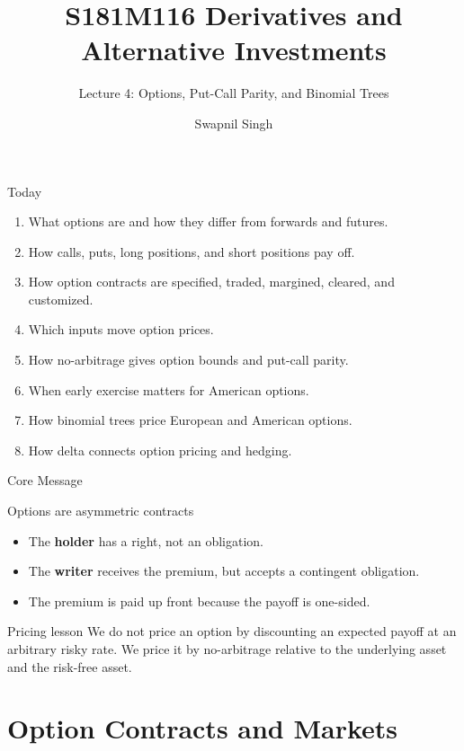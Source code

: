 \documentclass[aspectratio=169,11pt]{beamer}
\title{S181M116 Derivatives and Alternative Investments}
\subtitle{Lecture 4: Options, Put-Call Parity, and Binomial Trees}
\author{Swapnil Singh}
\institute{Lietuvos Bankas and Kaunas University of Technology}
\date{}
\begin{document}
\begin{frame}
    \titlepage
\end{frame}

\begin{frame}{Today}
    \begin{enumerate}
        \item What options are and how they differ from forwards and futures.
        \item How calls, puts, long positions, and short positions pay off.
        \item How option contracts are specified, traded, margined, cleared, and customized.
        \item Which inputs move option prices.
        \item How no-arbitrage gives option bounds and put-call parity.
        \item When early exercise matters for American options.
        \item How binomial trees price European and American options.
        \item How delta connects option pricing and hedging.
    \end{enumerate}
\end{frame}

\begin{frame}{Core Message}
    \begin{block}{Options are asymmetric contracts}
        \begin{itemize}
            \item The \textbf{holder} has a right, not an obligation.
            \item The \textbf{writer} receives the premium, but accepts a contingent obligation.
            \item The premium is paid up front because the payoff is one-sided.
        \end{itemize}
    \end{block}

    \vspace{0.6em}
    \begin{alertblock}{Pricing lesson}
        We do not price an option by discounting an expected payoff at an arbitrary risky rate.
        We price it by no-arbitrage relative to the underlying asset and the risk-free asset.
    \end{alertblock}
\end{frame}

\section{Option Contracts and Markets}
\end{document}
